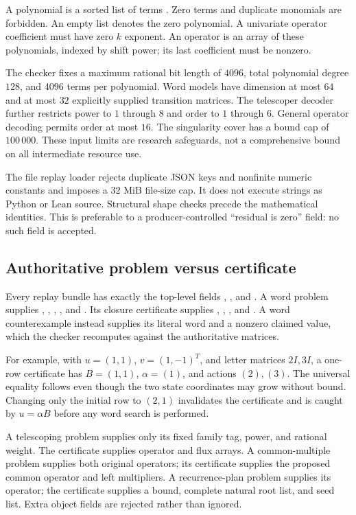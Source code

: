 A polynomial is a sorted list of terms
. Zero terms and duplicate
monomials are forbidden. An empty list denotes the zero polynomial. A
univariate operator coefficient must have zero $k$ exponent. An operator is an
array of these polynomials, indexed by shift power; its last coefficient must
be nonzero.

The checker fixes a maximum rational bit length of $4096$, total polynomial
degree $128$, and $4096$ terms per polynomial. Word models have dimension at
most $64$ and at most $32$ explicitly supplied transition matrices.
The telescoper decoder further restricts power to $1$ through $8$ and order to
$1$ through $6$. General operator decoding permits order at most $16$.
The singularity cover has a bound cap of $100\,000$. These input limits are
research safeguards, not a comprehensive bound on all intermediate resource
use.

The file replay loader rejects duplicate JSON keys and nonfinite numeric
constants and imposes a $32$ MiB file-size cap. It does not execute strings as
Python or Lean source. Structural shape checks precede the mathematical
identities. This is preferable to a producer-controlled ``residual is zero''
field: no such field is accepted.

\subsection{Authoritative problem versus certificate}

Every replay bundle has exactly the top-level fields
, , and . A word problem supplies
, , , , and
. Its closure certificate supplies
, , , and .
A word counterexample instead supplies its literal word and a nonzero claimed
value, which the checker recomputes against the authoritative matrices.

For example, with $u=(1,1)$, $v=(1,-1)^T$, and letter matrices $2I,3I$, a
one-row certificate has $B=(1,1)$, $\alpha=(1)$, and actions $(2),(3)$.
The universal equality follows even though the two state coordinates may grow
without bound. Changing only the initial row to $(2,1)$ invalidates the
certificate and is caught by $u=\alpha B$ before any word search is performed.

A telescoping problem supplies only its fixed family tag, power, and rational
weight. The certificate supplies operator and flux arrays. A common-multiple
problem supplies both original operators; its certificate supplies the proposed
common operator and left multipliers. A recurrence-plan problem supplies its
operator; the certificate supplies a bound, complete natural root list, and
seed list. Extra object fields are rejected rather than ignored.

